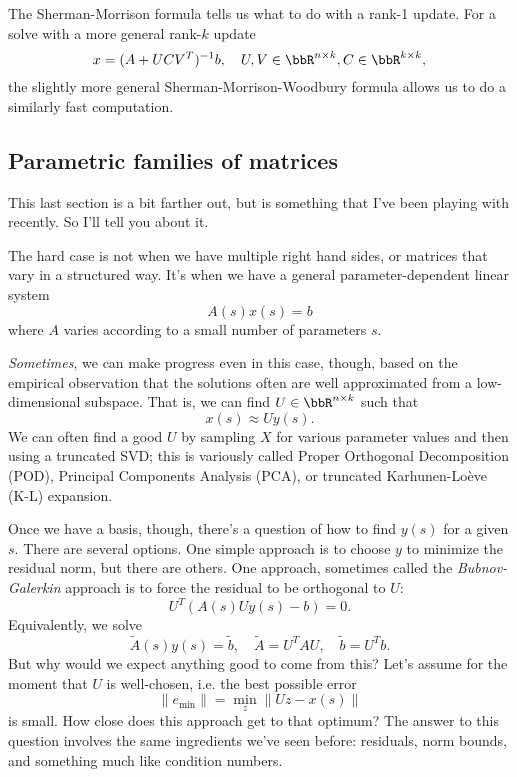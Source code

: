 \documentclass[12pt, leqno]{article}
\begin{document}
The Sherman-Morrison formula tells us what to do with a rank-1 update.
For a solve with a more general rank-$k$ update
\[
  x = (A+UCV^T)^{-1} b, \quad U, V \in \bbR^{n \times k}, C \in
  \bbR^{k \times k},
\]
the slightly more general Sherman-Morrison-Woodbury formula allows
us to do a similarly fast computation.

\subsection{Parametric families of matrices}

This last section is a bit farther out, but is something that I've
been playing with recently.  So I'll tell you about it.

The hard case is not when we have multiple right hand sides, or
matrices that vary in a structured way.  It's when we have a general
parameter-dependent linear system
\[
  A(s) x(s) = b
\]
where $A$ varies according to a small number of parameters $s$.

{\em Sometimes}, we can make progress even in this case, though, based on
the empirical observation that the solutions often are well
approximated from a low-dimensional subspace.  That is, we can
find $U \in \bbR^{n \times k}$ such that
\[
  x(s) \approx U y(s).
\]
We can often find a good $U$ by sampling $X$ for various parameter
values and then using a truncated SVD; this is variously called Proper
Orthogonal Decomposition (POD), Principal Components Analysis (PCA),
or truncated Karhunen-Lo\`eve (K-L) expansion.

Once we have a basis, though, there's a question of how to find $y(s)$
for a given $s$.  There are several options.  One simple approach is to
choose $y$ to minimize the residual norm, but there are others.  One
approach, sometimes called the {\em Bubnov-Galerkin} approach is to
force the residual to be orthogonal to $U$:
\[
  U^T \left( A(s) U y(s) - b \right) = 0.
\]
Equivalently, we solve
\[
  \tilde{A}(s) y(s) = \tilde{b}, \quad
  \tilde{A} = U^T A U, \quad
  \tilde{b} = U^T b.
\]
But why would we expect anything good to come from this?  Let's assume
for the moment that $U$ is well-chosen, i.e. the best possible error
\[
\|e_{\min}\| = \min_z \|Uz-x(s)\|
\]
is small.  How close does this approach get to that optimum?  The
answer to this question involves the same ingredients we've seen
before: residuals, norm bounds, and something much like condition
numbers.
\end{document}
